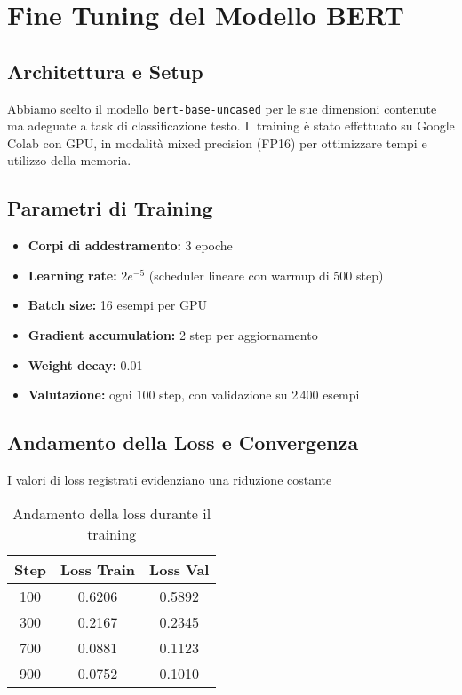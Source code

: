 \documentclass[a4paper,12pt]{article}
\begin{document}
\section{Fine Tuning del Modello BERT}
\subsection{Architettura e Setup}
Abbiamo scelto il modello \texttt{bert-base-uncased} per le sue dimensioni contenute ma adeguate a task di classificazione testo. Il training è stato effettuato su Google Colab con GPU, in modalità mixed precision (FP16) per ottimizzare tempi e utilizzo della memoria.

\subsection{Parametri di Training}
\begin{itemize}
  \item \textbf{Corpi di addestramento:} 3 epoche
  \item \textbf{Learning rate:} $2e^{-5}$ (scheduler lineare con warmup di 500 step)
  \item \textbf{Batch size:} 16 esempi per GPU
  \item \textbf{Gradient accumulation:} 2 step per aggiornamento
  \item \textbf{Weight decay:} 0.01
  \item \textbf{Valutazione:} ogni 100 step, con validazione su 2\,400 esempi
\end{itemize}

\subsection{Andamento della Loss e Convergenza}
I valori di loss registrati evidenziano una riduzione costante
\begin{table}[h!]
    \centering
    \begin{tabular}{|c|c|c|}  %
      \hline
      \textbf{Step} & \textbf{Loss Train} & \textbf{Loss Val} \\
      \hline
      100 & 0.6206 & 0.5892 \\
      300 & 0.2167 & 0.2345 \\
      700 & 0.0881 & 0.1123 \\
      900 & 0.0752 & 0.1010 \\
      \hline
    \end{tabular}
    \caption{Andamento della loss durante il training}
    \label{tab:loss}  %
  \end{table}
\end{document}
